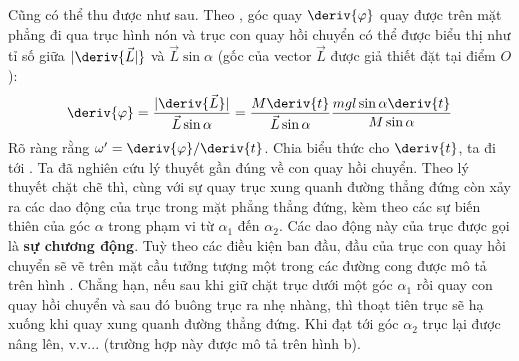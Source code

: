 Cũng có thể thu được  như sau. Theo , góc quay $\deriv{\varphi}$ quay được trên mặt phẳng đi qua trục hình nón và trục con quay hồi chuyển có thể được biểu thị như tỉ số giữa $|\deriv{\vec{L}|}$ và $\vec{L} \sin \alpha$ (gốc của vector $\vec{L}$ được giả thiết đặt tại điểm $O$):
\begin{equation}\label{eq:5_72'}
    \deriv{\varphi}=\frac{|\deriv{\vec{L}}|}{\vec{L}\sin \alpha}=\frac{M\deriv{t}}{\vec{L}\sin\alpha}\frac{mgl\sin\alpha\deriv{t}}{M\sin\alpha}
\end{equation}
Rõ ràng rằng $\omega'=\deriv{\varphi}/\deriv{t}$. Chia biểu thức  cho $\deriv{t}$, ta đi tới .
Ta đã nghiên cứu lý thuyết gần đúng về con quay hồi chuyển. Theo lý thuyết chặt chẽ thì, cùng với sự quay trục xung quanh đường thẳng đứng còn xảy ra các dao động của trục trong mặt phẳng thẳng đứng, kèm theo các sự biến thiên của góc $\alpha$ trong phạm vi từ $\alpha_1$ đến $\alpha_2$. Các dao động này của trục được gọi là \textbf{sự chương động}. Tuỳ theo các điều kiện ban đầu, đầu của trục con quay hồi chuyển sẽ vẽ trên mặt cầu tưởng tượng một trong các đường cong được mô tả trên hình . Chẳng hạn, nếu sau khi giữ chặt trục dưới một góc $\alpha_1$ rồi quay con quay hồi chuyển và sau đó buông trục ra nhẹ nhàng, thì thoạt tiên trục sẽ hạ xuống khi quay xung quanh đường thẳng đứng. Khi đạt tới góc $\alpha_2$ trục lại được nâng lên, v.v... (trường hợp này được mô tả trên hình b).

